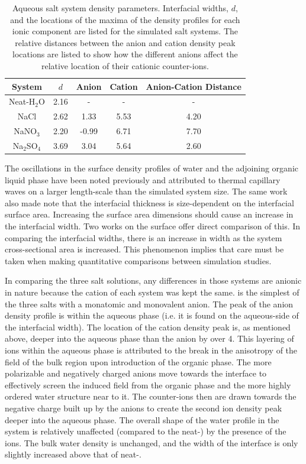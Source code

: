 \begin{table}[htdp]
	\begin{center}
	\begin{tabular}{|c||c|c|c|c|}
		\hline
		System & $d$ & Anion & Cation & Anion-Cation Distance \\ \hline
		Neat-H$_2$O & 2.16 & - & - & - \\ 
		NaCl & 2.62 & 1.33 & 5.53 & 4.20 \\
		NaNO$_3$ & 2.20 & -0.99 & 6.71 & 7.70 \\
		Na$_2$SO$_4$ & 3.69 & 3.04 & 5.64 & 2.60 \\
		\hline
	\end{tabular}
	\end{center}
	\caption{Aqueous salt system density parameters. Interfacial widths, $d$, and the locations of the maxima of the density profiles for each ionic component are listed for the simulated salt systems. The relative distances between the anion and cation density peak locations are listed to show how the different anions affect the relative location of their cationic counter-ions.}
	\label{system-params}
\end{table}

The oscillations in the surface density profiles of water and the adjoining organic \ctc liquid phase have been noted previously and attributed to thermal capillary waves on a larger length-scale than the simulated system size.\cite{Chang1996} The same work also made note that the interfacial thickness is size-dependent on the interfacial surface area. Increasing the surface area dimensions should cause an increase in the interfacial width. Two works on the \ctcwat surface offer direct comparison of this.\cite{Chang1996,Hore2008} In comparing the interfacial widths, there is an increase in width as the system cross-sectional area is increased. This phenomenon implies that care must be taken when making quantitative comparisons between simulation studies.

In comparing the three salt solutions, any differences in those systems are anionic in nature because the cation of each system was kept the same. \nacl is the simplest of the three salts with a monatomic and monovalent anion. The peak of the anion density profile is within the aqueous phase (i.e. it is found on the aqueous-side of the interfacial width). The location of the cation density peak is, as mentioned above, deeper into the aqueous phase than the anion by over 4\angs. This layering of ions within the aqueous phase is attributed to the break in the anisotropy of the field of the bulk region upon introduction of the organic phase. The more polarizable and negatively charged anions move towards the interface to effectively screen the induced field from the organic phase and the more highly ordered water structure near to it. The counter-ions then are drawn towards the negative charge built up by the anions to create the second ion density peak deeper into the aqueous phase. The overall shape of the water profile in the \nacl system is relatively unaffected (compared to the neat-\wat) by the presence of the ions. The bulk water density is unchanged, and the width of the interface is only slightly increased above that of neat-\wat.

